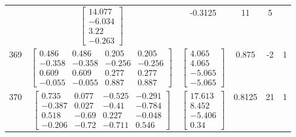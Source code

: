 \documentclass[a4paper,12pt]{article}
\begin{document}
\begin{tabular}{c c c c c c}
&
$\begin{bmatrix} 14.077 \\ -6.034 \\ 3.22 \\ -0.263 \end{bmatrix}$
&
-0.3125
&
11
&
5
\\
369
&
$\begin{bmatrix} 0.486 & 0.486 & 0.205 & 0.205 \\ -0.358 & -0.358 & -0.256 & -0.256 \\ 0.609 & 0.609 & 0.277 & 0.277 \\ -0.055 & -0.055 & 0.887 & 0.887 \end{bmatrix}$
&
$\begin{bmatrix} 4.065 \\ 4.065 \\ -5.065 \\ -5.065 \end{bmatrix}$
&
0.875
&
-2
&
1
\\
370
&
$\begin{bmatrix} 0.735 & 0.077 & -0.525 & -0.291 \\ -0.387 & 0.027 & -0.41 & -0.784 \\ 0.518 & -0.69 & 0.227 & -0.048 \\ -0.206 & -0.72 & -0.711 & 0.546 \end{bmatrix}$
&
$\begin{bmatrix} 17.613 \\ 8.452 \\ -5.406 \\ 0.34 \end{bmatrix}$
&
0.8125
&
21
&
1
\\
\end{tabular} \egroup \newpage
\end{document}
